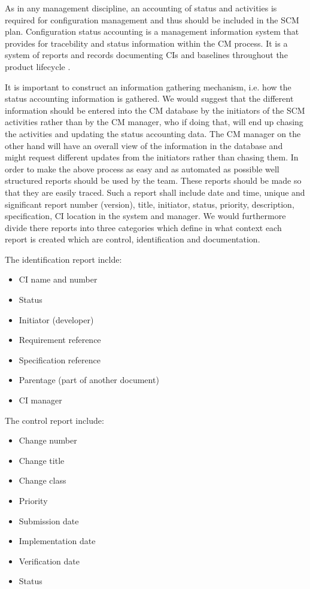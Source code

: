 \documentclass[a4paper]{article}
\begin{document}
As in any management discipline, an accounting of status and activities is required for configuration management \cite{daniels} and thus should be included in the SCM plan. Configuration status accounting is a management information system that provides for tracebility and status information within the CM process. It is a system of reports and records documenting CIs and baselines throughout the product lifecycle \cite{daniels}. 

It is important to construct an information gathering mechanism, i.e. how the status accounting information is gathered. We would suggest that the different information should be entered into the CM database by the initiators of the SCM activities rather than by the CM manager, who if doing that, will end up chasing the activities and updating the status accounting data. The CM manager on the other hand will have an overall view of the information in the database and might request different updates from the initiators rather than chasing them. In order to make the above process as easy and as automated as possible well structured reports should be used by the team. These reports should be made so that they are easily traced. Such a report shall include date and time, unique and significant report number (version), title, initiator, status, priority, description, specification, CI location in the system and manager. We would furthermore divide there reports into three categories which define in what context each report is created which are control, identification and documentation.

The identification report inclde:
\begin{itemize}
  \item CI name and number
  \item Status
  \item Initiator (developer)
  \item Requirement reference
  \item Specification reference
  \item Parentage (part of another document)
  \item CI manager
\end{itemize}

The control report include:
\begin{itemize}
  \item Change number
  \item Change title
  \item Change class
  \item Priority
  \item Submission date
  \item Implementation date
  \item Verification date
  \item Status
\end{itemize}
\end{document}
